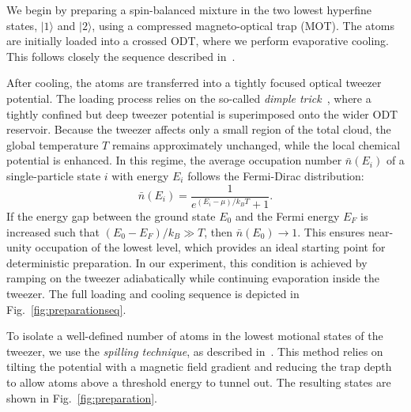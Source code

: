 






We begin by preparing a spin-balanced mixture in the two lowest hyperfine states, $|1\rangle$ and $|2\rangle$, using a compressed magneto-optical trap (MOT). The atoms are initially loaded into a crossed ODT, where we perform evaporative cooling. This follows closely the sequence described in~\cite{culemann_construction_2024}.

After cooling, the atoms are transferred into a tightly focused optical tweezer potential. The loading process relies on the so-called \emph{dimple trick}~\cite{zurn_few-fermion_2012}, where a tightly confined but deep tweezer potential is superimposed onto the wider ODT reservoir. Because the tweezer affects only a small region of the total cloud, the global temperature $T$ remains approximately unchanged, while the local chemical potential is enhanced. In this regime, the average occupation number $\bar{n}(E_i)$ of a single-particle state $i$ with energy $E_i$ follows the Fermi-Dirac distribution:
\begin{equation}
    \bar{n}(E_i) = \frac{1}{e^{(E_i - \mu)/k_B T} + 1}.
\end{equation}
If the energy gap between the ground state $E_0$ and the Fermi energy $E_F$ is increased such that $(E_0 - E_F) / k_B \gg T$, then $\bar{n}(E_0) \rightarrow 1$. This ensures near-unity occupation of the lowest level, which provides an ideal starting point for deterministic preparation. In our experiment, this condition is achieved by ramping on the tweezer adiabatically while continuing evaporation inside the tweezer. The full loading and cooling sequence is depicted in Fig.~\ref{fig:preparationseq}.

To isolate a well-defined number of atoms in the lowest motional states of the tweezer, we use the \emph{spilling technique}, as described in~\cite{zurn_few-fermion_2012, holten_pauli_2022}. This method relies on tilting the potential with a magnetic field gradient and reducing the trap depth to allow atoms above a threshold energy to tunnel out. 
The resulting states are shown in Fig.~\ref{fig:preparation}.

